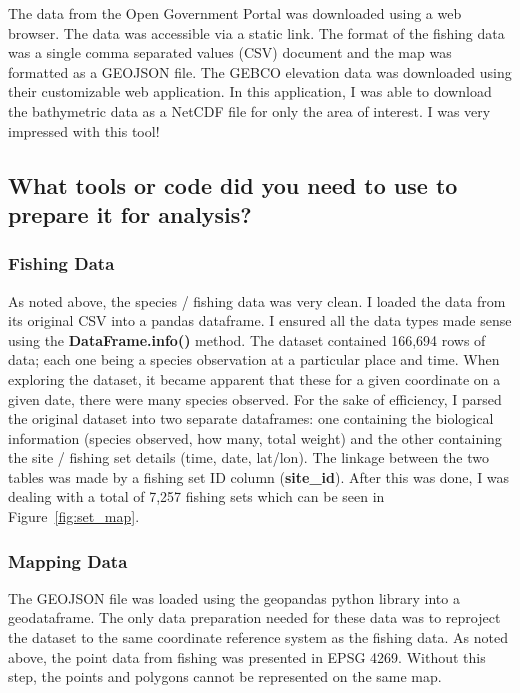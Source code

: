 The data from the Open Government Portal was downloaded using a web browser.
The data was accessible via a static link.
The format of the fishing data was a single comma separated values (CSV) document and the map was formatted as a GEOJSON file.
The GEBCO elevation data was downloaded using their customizable web application.
In this application, I was able to download the bathymetric data as a NetCDF file for only the area of interest.
I was very impressed with this tool!


\subsection{What tools or code did you need to use to prepare it for analysis?}


\subsubsection{Fishing Data}

As noted above, the species / fishing data was very clean.
I loaded the data from its original CSV into a pandas dataframe.
I ensured all the data types made sense using the \textbf{DataFrame.info()} method.
The dataset contained 166,694 rows of data; each one being a species observation at a particular place and time.
When exploring the dataset, it became apparent that these for a given coordinate on a given date, there were many species observed.
For the sake of efficiency, I parsed the original dataset into two separate dataframes:
one containing the biological information (species observed, how many, total weight)
and the other containing the site / fishing set details (time, date, lat/lon).
The linkage between the two tables was made by a fishing set ID column (\textbf{site\_id}).
After this was done, I was dealing with a total of 7,257 fishing sets which can be seen in Figure~\ref{fig:set_map}.


\subsubsection{Mapping Data}

The GEOJSON file was loaded using the geopandas python library into a geodataframe.
The only data preparation needed for these data was to reproject the dataset to the same coordinate reference system as the fishing data.
As noted above, the point data from fishing was presented in EPSG 4269.
Without this step, the points and polygons cannot be represented on the same map.


